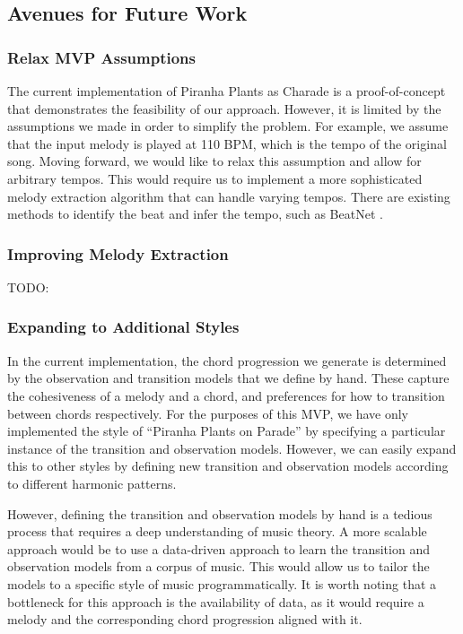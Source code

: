 \subsection{Avenues for Future Work}
\label{sec:avenues}

\subsubsection{Relax MVP Assumptions}

The current implementation of Piranha Plants as Charade is a proof-of-concept that demonstrates the feasibility of our approach. However, it is limited by the assumptions we made in order to simplify the problem. For example, we assume that the input melody is played at 110 BPM, which is the tempo of the original song. Moving forward, we would like to relax this assumption and allow for arbitrary tempos. This would require us to implement a more sophisticated melody extraction algorithm that can handle varying tempos. There are existing methods to identify the beat and infer the tempo, such as BeatNet \cite{BeatNet:2021}.

\subsubsection{Improving Melody Extraction}

TODO:

\subsubsection{Expanding to Additional Styles}

In the current implementation, the chord progression we generate is determined by the observation and transition models that we define by hand. These capture the cohesiveness of a melody and a chord, and preferences for how to transition between chords respectively. For the purposes of this MVP, we have only implemented the style of ``Piranha Plants on Parade'' by specifying a particular instance of the transition and observation models. However, we can easily expand this to other styles by defining new transition and observation models according to different harmonic patterns.

However, defining the transition and observation models by hand is a tedious process that requires a deep understanding of music theory. A more scalable approach would be to use a data-driven approach to learn the transition and observation models from a corpus of music. This would allow us to tailor the models to a specific style of music programmatically. It is worth noting that a bottleneck for this approach is the availability of data, as it would require a melody and the corresponding chord progression aligned with it.

